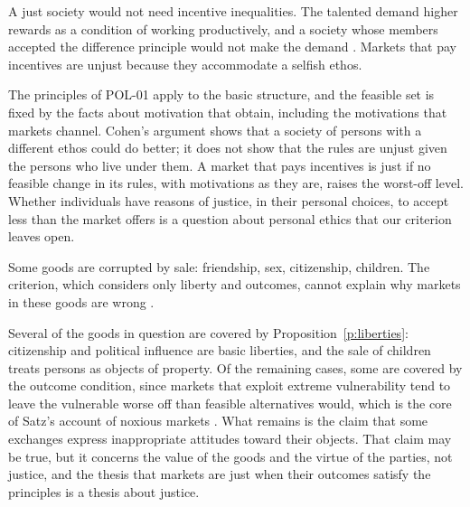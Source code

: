 \documentclass{situationist-preprint}
\begin{document}
\begin{objection}
A just society would not need incentive inequalities. The talented demand higher rewards as a condition of working productively, and a society whose members accepted the difference principle would not make the demand \citep{Cohen2008}. Markets that pay incentives are unjust because they accommodate a selfish ethos.
\end{objection}

\begin{reply}
The principles of POL-01 apply to the basic structure, and the feasible set is fixed by the facts about motivation that obtain, including the motivations that markets channel. Cohen's argument shows that a society of persons with a different ethos could do better; it does not show that the rules are unjust given the persons who live under them. A market that pays incentives is just if no feasible change in its rules, with motivations as they are, raises the worst-off level. Whether individuals have reasons of justice, in their personal choices, to accept less than the market offers is a question about personal ethics that our criterion leaves open.
\end{reply}

\begin{objection}
Some goods are corrupted by sale: friendship, sex, citizenship, children. The criterion, which considers only liberty and outcomes, cannot explain why markets in these goods are wrong \citep{Anderson1993,Sandel2012}.
\end{objection}

\begin{reply}
Several of the goods in question are covered by Proposition~\ref{p:liberties}: citizenship and political influence are basic liberties, and the sale of children treats persons as objects of property. Of the remaining cases, some are covered by the outcome condition, since markets that exploit extreme vulnerability tend to leave the vulnerable worse off than feasible alternatives would, which is the core of Satz's account of noxious markets \citep{Satz2010}. What remains is the claim that some exchanges express inappropriate attitudes toward their objects. That claim may be true, but it concerns the value of the goods and the virtue of the parties, not justice, and the thesis that markets are just when their outcomes satisfy the principles is a thesis about justice.
\end{reply}
\end{document}
